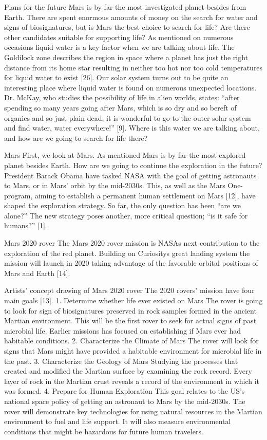  
Plans for the future
Mars is by far the most investigated planet besides from Earth. 
There are spent enormous amounts of money on the search for water and signs of biosignatures, but is Mars the best choice to search for life? 
Are there other candidates suitable for supporting life? 
As mentioned on numerous occasions liquid water is a key factor when we are talking about life. 
The Goldilock zone describes the region in space where a planet has just the right distance from its home star resulting in neither too hot nor too cold temperatures for liquid water to exist [26]. 
Our solar system turns out to be quite an interesting place where liquid water is found on numerous unexpected locations. 
Dr. McKay, who studies the possibility of life in alien worlds, states: “after spending so many years going after Mars, which is so dry and so bereft of organics and so just plain dead, it is wonderful to go to the outer solar system and find water, water everywhere!” [9].
Where is this water we are talking about, and how are we going to search for life there?
 
Mars
First, we look at Mars. 
As mentioned Mars is by far the most explored planet besides Earth. 
How are we going to continue the exploration in the future?
President Barack Obama have tasked NASA with the goal of getting astronauts to Mars, or in Mars' orbit by the mid-2030s. 
This, as well as the Mars One-program, aiming to establish a permanent human settlement on Mars [12], have shaped the exploration strategy. 
So far, the only question has been “are we alone?” 
The new strategy poses another, more critical question; “is it safe for humans?” [1].

Mars 2020 rover
The Mars 2020 rover mission is NASAs next contribution to the exploration of the red planet. 
Building on Curiositys great landing system the mission will launch in 2020 taking advantage of the favorable orbital positions of Mars and Earth [14]. 


Artists’ concept drawing of Mars 2020 rover
The 2020 rovers’ mission have four main goals [13]. 
1.	Determine whether life ever existed on Mars
The rover is going to look for sign of biosignatures preserved in rock samples formed in the ancient Martian environment. This will be the first rover to seek for actual signs of past microbial life. Earlier missions has focused on establishing if Mars ever had habitable conditions.
2.	Characterize the Climate of Mars
The rover will look for signs that Mars might have provided a habitable environment for microbial life in the past.
3.	Characterize the Geology of Mars
Studying the processes that created and modified the Martian surface by examining the rock record. Every layer of rock in the Martian crust reveals a record of the environment in which it was formed.
4.	Prepare for Human Exploration
This goal relates to the US’s national space policy of getting an astronaut to Mars by the mid-2030s. The rover will demonstrate key technologies for using natural resources in the Martian environment to fuel and life support. It will also measure environmental conditions that might be hazardous for future human travelers. 

